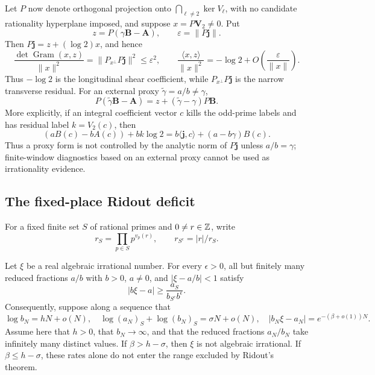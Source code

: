 \begin{remark}
Let \(P\) now denote orthogonal projection onto
\(\bigcap_{\ell\ne2}\ker V_\ell\), with no candidate rationality
hyperplane imposed, and suppose \(x=P\mathbf V_2\ne0\).  Put
\[
 z=P(\gamma\mathbf B-\mathbf A),
 \qquad \varepsilon=\|P\mathbf j\|.
\]
Then \(P\mathbf j=z+(\log2)x\), and hence
\begin{equation}\label{eq:log2-shear}
 \frac{\det\operatorname{Gram}(x,z)}{\|x\|^2}
 =\|P_{x^\perp}P\mathbf j\|^2\le\varepsilon^2,
 \qquad
 \frac{\langle x,z\rangle}{\|x\|^2}
 =-\log2+O\!\left(\frac\varepsilon{\|x\|}\right).
\end{equation}
Thus \(-\log2\) is the longitudinal shear coefficient, while
\(P_{x^\perp}P\mathbf j\) is the narrow transverse residual.  For an
external proxy \(\widetilde\gamma=a/b\ne\gamma\),
\[
 P(\widetilde\gamma\mathbf B-\mathbf A)
 =z+(\widetilde\gamma-\gamma)P\mathbf B.
\]
More explicitly, if an integral coefficient vector \(c\) kills the
odd-prime labels and has residual label \(k=V_2(c)\), then
\[
 (aB(c)-bA(c))+bk\log2
 =b\langle\mathbf j,c\rangle+(a-b\gamma)B(c).
\]
Thus a proxy form is not controlled by the analytic norm of \(P\mathbf j\)
unless \(a/b=\gamma\); finite-window diagnostics based on an external proxy
cannot be used as irrationality evidence.
\end{remark}

\subsection{The fixed-place Ridout deficit}

For a fixed finite set \(S\) of rational primes and \(0\ne r\in\mathbb Z\), write
\[
 r_S=\prod_{p\in S}p^{v_p(r)},
 \qquad r_{S^c}=|r|/r_S.
\]

\begin{proposition}
\label{prop:ridout-budget}
Let \(\xi\) be a real algebraic irrational number.  For every
\(\epsilon>0\), all but finitely many reduced fractions \(a/b\) with
\(b>0\), \(a\ne0\), and \(|\xi-a/b|<1\) satisfy
\begin{equation}\label{eq:ridout-linear-form}
 |b\xi-a|\ge\frac{a_S}{b_{S^c}b^\epsilon}.
\end{equation}
Consequently, suppose along a sequence that
\[
 \log b_N=hN+o(N),
 \quad
 \log(a_N)_S+\log(b_N)_S=\sigma N+o(N),
 \quad
 |b_N\xi-a_N|=e^{-(\beta+o(1))N}.
\]
Assume here that \(h>0\), that \(b_N\to\infty\), and that the reduced
fractions \(a_N/b_N\) take infinitely many distinct values.
If \(\beta>h-\sigma\), then \(\xi\) is not algebraic irrational.  If
\(\beta\le h-\sigma\), these rates alone do not enter the range excluded by
Ridout's theorem.
\end{proposition}


